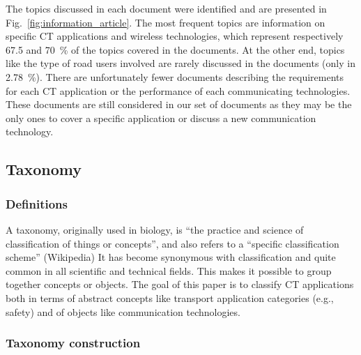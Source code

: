 The topics discussed in each document were identified and are presented in Fig.~\ref{fig:information_article}. The most frequent topics are information on specific \acrshort{CT} applications and wireless technologies, which represent respectively 67.5 and 70~\% of the topics covered in the documents. At the other end, topics like the type of road users involved are rarely discussed in the documents (only in 2.78~\%). 
There are unfortunately fewer documents describing the requirements for each \acrshort{CT} application or the performance of each communicating technologies. These documents are still considered in our set of documents as they may be the only ones to cover a specific application or discuss a new communication technology. 

\subsection{Taxonomy}
\subsubsection{Definitions}

A taxonomy, originally used in biology, is ``the practice and science of classification of things or concepts'', and also refers to a ``specific classification scheme'' (Wikipedia) \cite{wikipedia_taxonomy_2021}
It has become synonymous with classification and quite common in all scientific and technical fields. This makes it possible to group together concepts or objects. The goal of this paper is to classify \acrshort{CT} applications both in terms of abstract concepts like transport application categories (e.g., safety) and of objects like communication technologies. 

\subsubsection{Taxonomy construction}

